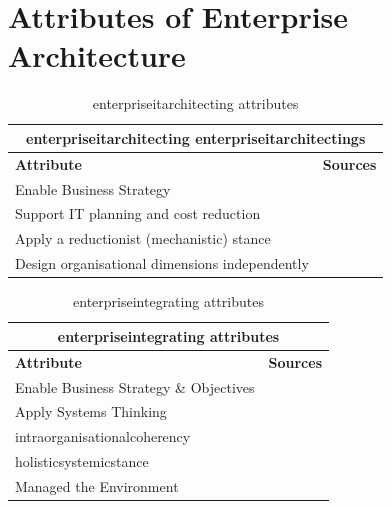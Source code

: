 \section{Attributes of Enterprise Architecture}
\label{sec:attributesonea}

\begin{table}[H]%
	\begin{center}%
		\begin{tabular}{@{}ll@{}}%
			\multicolumn{2}{c}{\textbf{\gls{enterpriseitarchitecting} \glspl{enterpriseitarchitecting}}} \\%
			\toprule %
			\textbf{Attribute} & \textbf{Sources} \\%
			\midrule%
			Enable Business Strategy & \parencite{Lapalme2012} \\%
			Support IT planning and cost reduction & \parencite{Lapalme2012} \\%
			Apply a reductionist (mechanistic) stance & \parencite{Lapalme2012} \\%
			Design organisational dimensions independently & \parencite{Lapalme2012} \\%
			\bottomrule%
		\end{tabular}%
		\caption[\Gls{enterpriseitarchitecting} \glspl{attribute}]{\Gls{enterpriseitarchitecting} \glspl{attribute}}%
		\label{tab:attributesofenterpriseitarchitecting}%
	\end{center}%
\end{table}%

\begin{table}[H]%
	\begin{center}%
		\begin{tabular}{@{}ll@{}}%
			\multicolumn{2}{c}{\textbf{\Gls{enterpriseintegrating} \glspl{attribute}}} \\%
			\toprule %
			\textbf{Attribute} & \textbf{Sources} \\%
			\midrule %
			Enable Business Strategy \& Objectives & \parencite{Lapalme2012} \\%
			Apply Systems Thinking & \parencite{Lapalme2012} \\%
			\Gls{intraorganisationalcoherency} & \parencite{Lapalme2012} \\%
			\Gls{holisticsystemicstance} & \parencite{Lapalme2012} \\%
			Managed the Environment & \parencite{Lapalme2012} \\%
			\bottomrule%
		\end{tabular}%
		\caption[\Gls{enterpriseintegrating} \glspl{attribute}]{\Gls{enterpriseintegrating} \glspl{attribute}}%
		\label{tab:attributesofenterpriseintegrating}%
	\end{center}%
\end{table}%

